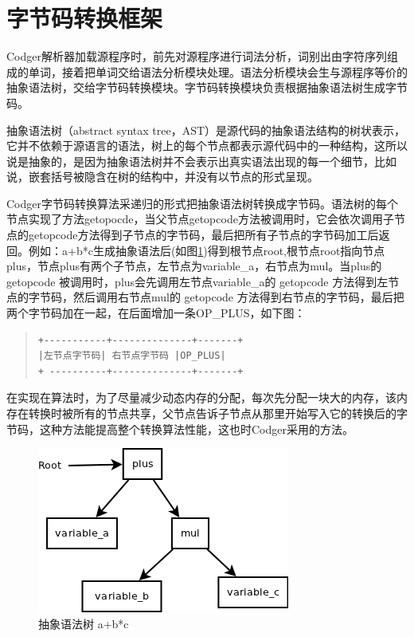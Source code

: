 \section{字节码转换框架}
Codger解析器加载源程序时，前先对源程序进行词法分析，词别出由字符序列组成的单词，接着把单词交给语法分析模块处理。语法分析模块会生与源程序等价的抽象语法树，交给字节码转换模块。字节码转换模块负责根据抽象语法树生成字节码。

抽象语法树（abstract syntax tree，AST）是源代码的抽象语法结构的树状表示，它并不依赖于源语言的语法，树上的每个节点都表示源代码中的一种结构，这所以说是抽象的，是因为抽象语法树并不会表示出真实语法出现的每一个细节，比如说，嵌套括号被隐含在树的结构中，并没有以节点的形式呈现。

Codger字节码转换算法采递归的形式把抽象语法树转换成字节码。语法树的每个节点实现了方法getopocde，当父节点getopcode方法被调用时，它会依次调用子节点的getopcode方法得到子节点的字节码，最后把所有子节点的字节码加工后返回。例如：a+b*c生成抽象语法后(如图\ref{fig:abs_tree2})得到根节点root,根节点root指向节点plus，节点plus有两个子节点，左节点为variable\_a，右节点为mul。当plus的 getopcode 被调用时，plus会先调用左节点variable\_a的 getopcode 方法得到左节点的字节码，然后调用右节点mul的 getopcode 方法得到右节点的字节码，最后把两个字节码加在一起，在后面增加一条OP\_PLUS，如下图：
\begin{quote}
\begin{verbatim}
+-----------+--------------+-------+
|左节点字节码| 右节点字节码 |OP_PLUS|
+ ----------+--------------+-------+
\end{verbatim}
\end{quote}
在实现在算法时，为了尽量减少动态内存的分配，每次先分配一块大的内存，该内存在转换时被所有的节点共享，父节点告诉子节点从那里开始写入它的转换后的字节码，这种方法能提高整个转换算法性能，这也时Codger采用的方法。
\begin{figure}
 \centering
 \includegraphics[scale=1]{abs_tree2.png}
 \caption{抽象语法树 a+b*c}
 \label{fig:abs_tree2}
\end{figure}

